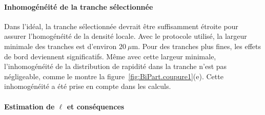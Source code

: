 %
%

\paragraph{Inhomogénéité de la tranche sélectionnée}

Dans l’idéal, la tranche sélectionnée devrait être suffisamment étroite pour assurer l’homogénéité de la densité locale. Avec le protocole utilisé, la largeur minimale des tranches est d’environ $20~\mu\mathrm{m}$. Pour des tranches plus fines, les effets de bord deviennent significatifs. Même avec cette largeur minimale, l’inhomogénéité de la distribution de rapidité dans la tranche n’est pas négligeable, comme le montre la figure~\ref{fig:BiPart.coupure1}(e). Cette inhomogénéité a été prise en compte dans les calculs.

\paragraph{Estimation de $\ell$ et conséquences}

